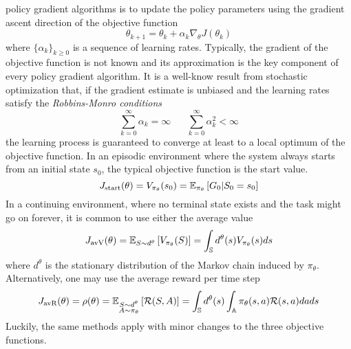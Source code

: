 policy gradient algorithms is to update the policy parameters using the gradient ascent direction of the objective function
\begin{equation}
	\theta_{k+1} = \theta_k + \alpha_k \nabla_\theta J\left(\theta_k\right)
\end{equation}
where $\{\alpha_k\}_{k\geq 0}$ is a sequence of learning rates. Typically, the
gradient of the objective function is not known and its approximation is the key component of every policy gradient algorithm. It is a well-know result from stochastic optimization \cite{kushner2003stochastic} that, if the gradient estimate is unbiased and the learning rates satisfy the \emph{Robbins-Monro conditions}
\begin{equation}
	\sum_{k=0}^\infty \alpha_k = \infty \;\;\;\;\;\; \sum^{\infty}_{k=0}
	\alpha_k^2 < \infty 
\end{equation}
the learning process is guaranteed to converge at least to a local optimum of
the objective function. In an episodic environment where the system always starts from an initial state $s_0$, the typical objective function is the start value.
\begin{equation}
	J_{\text{start}}(\theta) = V_{\pi_\theta}(s_0) = \E[\pi_\theta]{G_0 |
 S_0 = s_0}
\end{equation}
In a continuing environment, where no terminal state exists and the task might go on forever, it is common to use either the average value 
\begin{equation}
	J_{\text{avV}}(\theta) = \E[S \sim d^{\theta}]{V_{\pi_\theta}(S)} = \int_\S
	d^{\theta}(s) V_{\pi_\theta}(s) ds
\end{equation}
where $d^\theta$ is the stationary distribution of the Markov chain induced by $\pi_\theta$. Alternatively, one may use the average reward per time step
\begin{equation}
	J_{\text{avR}}(\theta) = \rho(\theta) = \E[\substack{S \sim d^{\theta}\\A \sim \pi_\theta}]{\calR(S,A)} 
	= \int_\S d^{\theta}(s) \int_\A \pi_\theta(s,a) \calR(s,a) da ds
\end{equation}
Luckily, the same methods apply with minor changes to the three objective functions. 

